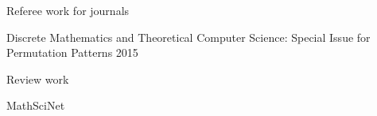 \begin{cventries}

\cventry
{Referee work for journals}
{}
{}
{}
{
\begin{cvitems} %
  \item {Discrete Mathematics and Theoretical Computer Science: Special Issue for Permutation Patterns 2015}
\end{cvitems}
}


\cventry
{Review work}
{}
{}
{}
{
\begin{cvitems} %
  \item {MathSciNet}
\end{cvitems}
}


\end{cventries}
